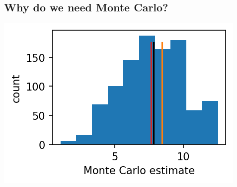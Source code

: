 \documentclass[12pt,letterpaper,noanswers]{exam}
\begin{document}
\subsection*{Why do we need Monte Carlo?}

\includegraphics{AM111-F23-CourseNotes/img/C16-MC4pts.png}
     
\end{document}
